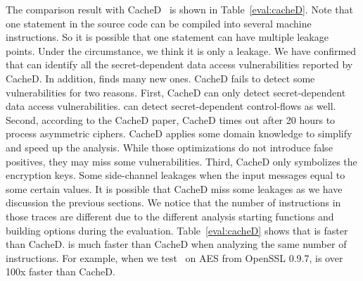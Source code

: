 The comparison result with CacheD~\cite{203878} is shown in Table~\ref{eval:cacheD}.
Note that one statement in the source code can be compiled into several machine instructions. So it is possible that one statement can have multiple leakage points. Under the circumstance, we think it is only a leakage.
We have confirmed that \tool{} can identify all the secret-dependent data access vulnerabilities reported by CacheD. In addition, \tool{} finds many new ones.
CacheD fails to detect some vulnerabilities for two
reasons. First, CacheD can only detect secret-dependent data access
vulnerabilities. \tool{} can detect secret-dependent control-flows as well.
Second, according to the CacheD paper, CacheD times out after 20 hours to process
asymmetric ciphers. CacheD applies some domain knowledge to simplify and speed up
the analysis.
While those optimizations do not introduce false positives, they may miss some
vulnerabilities.
Third, CacheD only symbolizes the encryption keys. Some side-channel leakages when the input messages equal to some certain values. It is possible that CacheD miss some
leakages as we have discussion the previous sections.
We notice that the number of instructions in those traces are different due to the different analysis starting functions and building options during the evaluation.
Table~\ref{eval:cacheD} shows that
\tool{} is faster than CacheD. \tool{} is much faster than CacheD when analyzing the same
number of instructions. For example, when we test~\tool{} on AES from OpenSSL
0.9.7, \tool{} is over 100x faster than CacheD.
